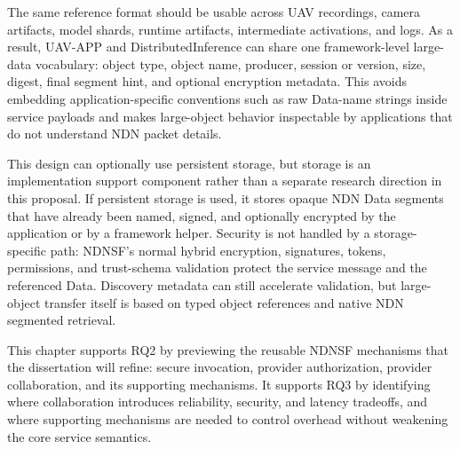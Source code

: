 The same reference format should be usable across UAV recordings, camera
artifacts, model shards, runtime artifacts, intermediate activations, and logs.
As a result, UAV-APP and DistributedInference can share one framework-level
large-data vocabulary: object type, object name, producer, session or version,
size, digest, final segment hint, and optional encryption metadata. This avoids
embedding application-specific conventions such as raw Data-name strings inside
service payloads and makes large-object behavior inspectable by applications
that do not understand NDN packet details.

This design can optionally use persistent storage, but storage is an
implementation support component rather than a separate research direction in
this proposal. If persistent storage is used, it stores opaque NDN Data
segments that have already been named, signed, and optionally encrypted by the
application or by a framework helper. Security is not handled by a storage-
specific path: NDNSF's normal hybrid encryption, signatures, tokens,
permissions, and trust-schema validation protect the service message and the
referenced Data. Discovery metadata can still accelerate validation, but large-
object transfer itself is based on typed object references and native NDN
segmented retrieval.

This chapter supports RQ2 by previewing the reusable NDNSF mechanisms that the
dissertation will refine: secure invocation, provider authorization,
provider collaboration, and its supporting mechanisms. It supports RQ3 by
identifying where collaboration introduces reliability, security, and latency
tradeoffs, and where supporting mechanisms are needed to control overhead
without weakening the core service semantics.
